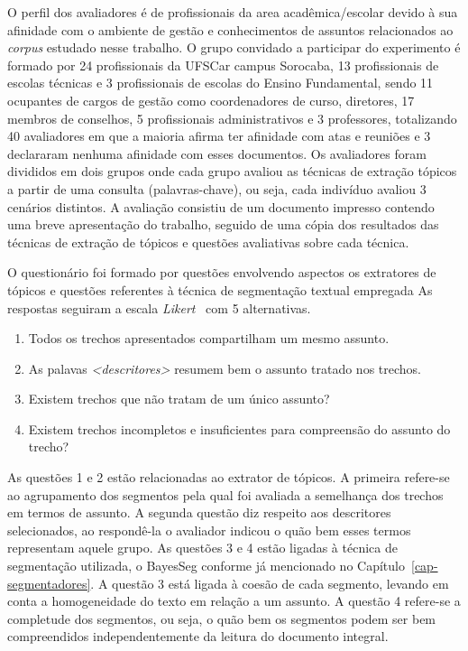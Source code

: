 O perfil dos avaliadores é de profissionais da area acadêmica/escolar devido à sua afinidade com o ambiente de gestão e conhecimentos de assuntos relacionados ao \textit{corpus} estudado nesse trabalho. O grupo convidado a participar do experimento é formado por 24 profissionais da UFSCar campus Sorocaba, 13 profissionais de escolas técnicas e 3 profissionais de escolas do Ensino Fundamental, sendo 11 ocupantes de cargos de gestão como coordenadores de curso, diretores, 17 membros de conselhos, 5 profissionais administrativos e 3 professores, totalizando 40 avaliadores em que a maioria afirma ter afinidade com atas e reuniões e 3 declararam nenhuma afinidade com esses documentos. Os avaliadores foram divididos em dois grupos onde cada grupo avaliou as técnicas de extração tópicos a partir de uma consulta (palavras-chave), ou seja, cada indivíduo avaliou 3 cenários distintos. A avaliação consistiu de um documento impresso contendo uma breve apresentação do trabalho, seguido de uma cópia dos resultados das técnicas de extração de tópicos e questões avaliativas sobre cada técnica.


O questionário foi formado por questões envolvendo aspectos os extratores de tópicos e questões referentes à técnica de segmentação textual empregada
As respostas seguiram a escala \textit{Likert}~\cite{Norman2010} com 5 alternativas. 

\begin{enumerate}
	\item Todos os trechos apresentados compartilham um mesmo assunto.
	\item As palavas \textit{<descritores>} resumem bem o assunto tratado nos trechos.
	\item Existem trechos que não tratam de um único assunto?
	\item Existem trechos incompletos e insuficientes para compreensão do assunto do trecho?
\end{enumerate}


As questões 1 e 2 estão relacionadas ao extrator de tópicos. A primeira refere-se ao agrupamento dos segmentos pela qual foi avaliada a semelhança dos trechos em termos de assunto. A segunda questão diz respeito aos descritores selecionados, ao respondê-la o avaliador indicou o quão bem esses termos representam aquele grupo.
As questões 3 e 4 estão ligadas à técnica de segmentação utilizada, o BayesSeg conforme já mencionado no Capítulo~\ref{cap-segmentadores}. A questão 3 está ligada à coesão de cada segmento, levando em conta a homogeneidade do texto em relação a um assunto. A questão 4 refere-se a completude dos segmentos, ou seja, o quão bem os segmentos podem ser bem compreendidos independentemente da leitura do documento integral.


